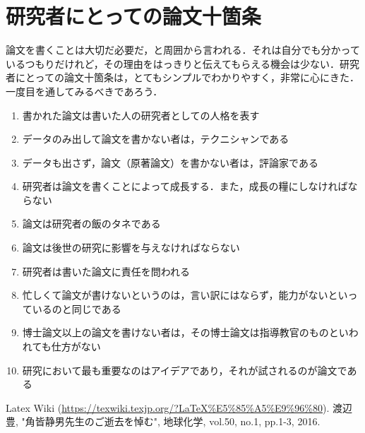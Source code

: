 \documentclass[a4paper,10pt,twocolumn,uplatex]{jsarticle}
\begin{document}
\section{研究者にとっての論文十箇条}
論文を書くことは大切だ必要だ，と周囲から言われる．それは自分でも分かっているつもりだけれど，その理由をはっきりと伝えてもらえる機会は少ない．研究者にとっての論文十箇条\cite{whats_paper}は，とてもシンプルでわかりやすく，非常に心にきた．一度目を通してみるべきであろう．

\begin{enumerate} %
  \item 書かれた論文は書いた人の研究者としての人格を表す
  \item データのみ出して論文を書かない者は，テクニシャンである
  \item データも出さず，論文（原著論文）を書かない者は，評論家である
  \item 研究者は論文を書くことによって成長する．また，成長の糧にしなければならない
  \item 論文は研究者の飯のタネである
  \item 論文は後世の研究に影響を与えなければならない
  \item 研究者は書いた論文に責任を問われる
  \item 忙しくて論文が書けないというのは，言い訳にはならず，能力がないといっているのと同じである
  \item 博士論文以上の論文を書けない者は，その博士論文は指導教官のものといわれても仕方がない
  \item 研究において最も重要なのはアイデアであり，それが試されるのが論文である
\end{enumerate}

\footnotesize{
  \begin{thebibliography}{99}
     Latex Wiki (\url{https://texwiki.texjp.org/?LaTeX%E5%85%A5%E9%96%80}).
     渡辺 豊, "角皆静男先生のご逝去を悼む", 地球化学, vol.50, no.1, pp.1-3, 2016.
  \end{thebibliography}
}

\end{document}
